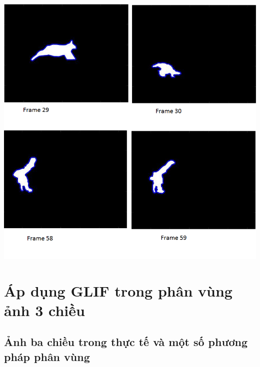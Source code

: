\documentclass[12pt, oneside, a4]{book}
\begin{document}
\begin{center}
\includegraphics[scale=0.5]{figure/animals.png}
\end{center}
\chapter{Áp dụng GLIF trong phân vùng ảnh 3 chiều}
\section{Ảnh ba chiều trong thực tế và một số phương pháp phân vùng}
\end{document}
